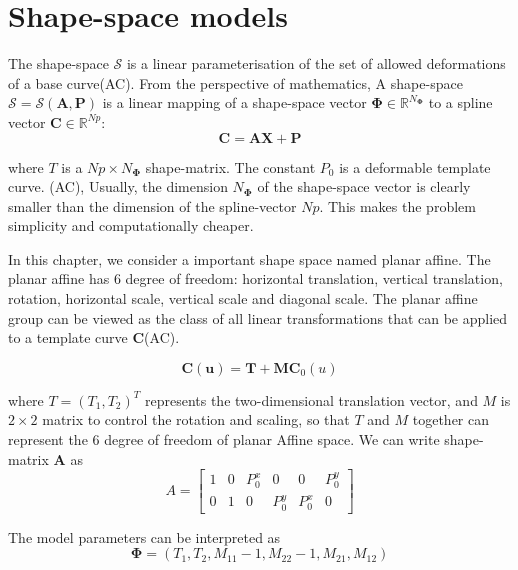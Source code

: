 \section{Shape-space models}
\label{sec:ssm}

The shape-space $\mathcal{S}$ is a linear parameterisation of the set of allowed
deformations of a base curve(AC). From the perspective of mathematics, A shape-space
$\mathcal{S} = \mathcal{S}(\mathbf{A},\mathbf{P})$ is a linear mapping of a shape-space
vector $\mathbf{\Phi} \in  \mathbb{R}^{N_{\mathbf{\Phi}}}$ to a spline vector $\mathbf{C} \in
\mathbb{R}^{Np}$:
\begin{equation}
  \label{eq:4.16}
  \mathbf{C} = \mathbf{A}\mathbf{X}+ \mathbf{P}
\end{equation}

where $T$ is a $Np \times N_{\mathbf{\Phi}}$ shape-matrix. The
constant  $P_0$ is a deformable template curve. (AC), Usually, the
dimension $N_{\mathbf{\Phi}}$ of the shape-space vector is clearly
smaller than the dimension of the spline-vector $Np$. This makes the
problem simplicity and computationally cheaper.

In this chapter, we consider a important shape space named planar
affine. The planar affine has 6 degree of freedom: horizontal
translation, vertical translation, rotation, horizontal scale,
vertical scale and diagonal scale. The planar affine group can be
viewed as the class of all linear transformations that can be applied
to a template curve $\mathbf{C}$(AC). 

\begin{equation}
  \label{eq:4.17}
  \mathbf{C(u)} = \mathbf{T} + \mathbf{M} \mathbf{C}_0(u)
\end{equation}

where $T = (T_1, T_2)^T$ represents the two-dimensional translation
vector, and $M$ is $2 \times 2$ matrix to control the rotation and
scaling, so that $T$ and $M$ together can represent the 6 degree of
freedom of planar Affine space. We can write shape-matrix $\mathbf{A}$
as 
\begin{equation}
  \label{eq:4.18}
  A =
  \begin{bmatrix}
    1 & 0 & P_0^x & 0 & 0 & P_0^y\\
    0 & 1 & 0 & P_0^y & P_0^x & 0
  \end{bmatrix}
\end{equation}

The model parameters can be interpreted as
\begin{equation}
  \label{eq:4.19}
  \mathbf{\Phi} =  (T_1, T_2, M_{11} - 1, M_{22} - 1, M_{21}, M_{12})
\end{equation}

